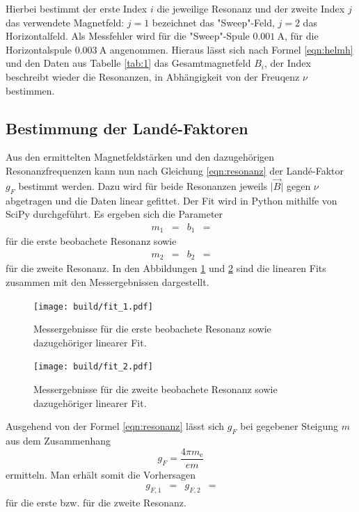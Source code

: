 Hierbei bestimmt der erste Index $i$ die jeweilige Resonanz und der zweite Index $j$ das verwendete Magnetfeld: $j=1$ bezeichnet das "Sweep"-Feld, $j=2$ das Horizontalfeld.
Als Messfehler wird für die "Sweep"-Spule $\SI{0.001}{\ampere}$, für die Horizontalspule $\SI{0.003}{\ampere}$ angenommen.
Hieraus lässt sich nach Formel \eqref{eqn:helmh} und den Daten aus Tabelle \ref{tab:1} das Gesamtmagnetfeld $B_i$, der Index beschreibt wieder die Resonanzen, in Abhängigkeit von der Freuqenz $\nu$ bestimmen.

\subsection{Bestimmung der Land\'{e}-Faktoren}
Aus den ermittelten Magnetfeldstärken und den dazugehörigen Resonanzfrequenzen kann nun nach Gleichung \ref{eqn:resonanz} der Land\'{e}-Faktor $g_F$ bestimmt werden.
Dazu wird für beide Resonanzen jeweils $\lvert \vec{B} \rvert$ gegen $\nu$ abgetragen und die Daten linear gefittet.
Der Fit wird in Python mithilfe von SciPy durchgeführt.
Es ergeben sich die Parameter
\begin{align*}
  m_1 &=  & b_1 &= 
\end{align*}
für die erste beobachete Resonanz sowie
\begin{align*}
  m_2 &=  & b_2 &= 
\end{align*}
für die zweite Resonanz.
In den Abbildungen \ref{plot:1} und \ref{plot:2} sind die linearen Fits zusammen mit den Messergebnissen dargestellt.
\begin{figure}
  \centering
  \texttt{[image: build/fit\_1.pdf]}
  \caption{Messergebnisse für die erste beobachete Resonanz sowie dazugehöriger linearer Fit.}
  \label{plot:1}
\end{figure}

\begin{figure}
  \centering
  \texttt{[image: build/fit\_2.pdf]}
  \caption{Messergebnisse für die zweite beobachete Resonanz sowie dazugehöriger linearer Fit.}
  \label{plot:2}
\end{figure}

Ausgehend von der Formel \ref{eqn:resonanz} lässt sich $g_F$ bei gegebener Steigung $m$ aus dem Zusammenhang
\begin{equation}
  g_F = \frac{4 \pi m_\text{e}}{e m}
\end{equation}
ermitteln.
Man erhält somit die Vorhersagen
\begin{align*}
  g_{F,1} &=  & g_{F,2} &= 
\end{align*}
für die erste bzw. für die zweite Resonanz.

